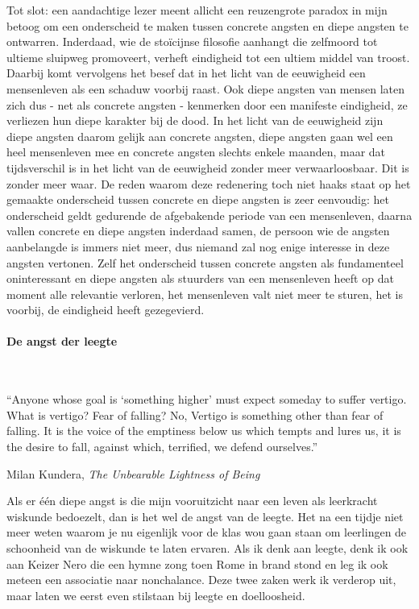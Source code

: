\documentclass[a4paper,11pt]{article}
\newcommand{\tussen}[1]{\paragraph*{#1}\mbox{}\\}
\theoremstyle{definition}
\begin{document}
Tot slot: een aandachtige lezer meent allicht een reuzengrote paradox in mijn betoog om een onderscheid
te maken tussen concrete angsten en diepe angsten te ontwarren. Inderdaad, wie de 
stoïcijnse filosofie aanhangt die zelfmoord tot ultieme sluipweg promoveert, 
verheft eindigheid tot een ultiem middel van troost. Daarbij komt vervolgens het besef dat in het licht van 
de eeuwigheid een mensenleven als een 
schaduw voorbij raast. Ook diepe angsten van mensen laten zich dus - net als concrete angsten - kenmerken door 
een manifeste eindigheid, ze verliezen hun diepe karakter bij de dood. 
In het licht van de eeuwigheid zijn diepe angsten daarom gelijk aan concrete 
angsten, diepe angsten gaan wel een heel mensenleven mee en concrete angsten 
slechts enkele maanden, maar dat tijdsverschil is in het licht van de eeuwigheid
zonder meer verwaarloosbaar. Dit is zonder meer waar. De reden waarom deze 
redenering toch niet haaks staat op het gemaakte onderscheid tussen concrete en 
diepe angsten is zeer eenvoudig: het onderscheid geldt gedurende de afgebakende periode van een 
mensenleven, daarna vallen concrete en diepe angsten inderdaad samen, de persoon 
wie de angsten aanbelangde is immers niet meer, dus niemand zal nog enige 
interesse in deze angsten vertonen. Zelf het onderscheid tussen concrete angsten 
als fundamenteel oninteressant en diepe angsten als stuurders van een 
mensenleven heeft op dat moment alle relevantie verloren, het mensenleven valt 
niet meer te sturen, het is voorbij, de eindigheid heeft gezegevierd.
 \tussen{De angst der leegte}
 \setlength{\epigraphwidth}{0.8\textwidth}
 \epigraph{``Anyone whose goal is `something higher' must expect someday to suffer vertigo. What is vertigo? Fear of falling? 
 No, Vertigo is something other than fear of falling. It is the voice of the emptiness below us which tempts and lures us, 
 it is the desire to fall, against which, terrified, we defend ourselves.''}{Milan Kundera, \emph{The Unbearable Lightness of Being}}

 Als er één diepe angst is die mijn vooruitzicht naar een leven als leerkracht 
 wiskunde bedoezelt, dan is het wel de angst van de leegte. Het na een tijdje niet meer weten waarom je nu eigenlijk
 voor de klas wou gaan staan om leerlingen de schoonheid van de wiskunde te laten ervaren. Als ik denk aan leegte,
 denk ik ook aan Keizer Nero die een hymne zong toen Rome in brand stond en leg ik ook meteen een associatie naar nonchalance.
 Deze twee zaken werk ik verderop uit, maar laten we eerst even stilstaan bij leegte en 
doelloosheid.\\
\end{document}
